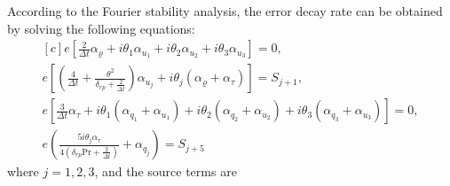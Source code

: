 \documentclass[onefignum,onetabnum]{siamart171218}
\begin{document}
According to the Fourier stability analysis, the error decay rate can be obtained by solving the following equations:
\begin{equation}\label{L_lin1_time_dependent}
\begin{aligned}[c]
e\left[\frac{2}{\Delta{t}}\alpha_\varrho+i\theta_1\alpha_{u_1}+i\theta_2\alpha_{u_2}+i\theta_3\alpha_{u_3}\right]=0, \\
e\left[\left(\frac{4}{\Delta{t}}+\frac{{\theta}^2}{\delta_{rp}+\frac{2}{\Delta{t}}}\right)\alpha_{u_j}+i\theta_j(\alpha_\varrho+\alpha_{\tau})\right]=S_{j+1},\\
e\left[\frac{3}{\Delta{t}}\alpha_{\tau}
+i\theta_1(\alpha_{q_1}+\alpha_{u_1})
+i\theta_2(\alpha_{q_2}+\alpha_{u_2})
+i\theta_3(\alpha_{q_3}+\alpha_{u_3})\right]=0,\\
e\left(\frac{5i\theta_j\alpha_{\tau}}{4(\delta_{rp}\text{Pr}+\frac{2}{\Delta{}t})}+\alpha_{q_j}\right)=S_{j+5}
\end{aligned}
\end{equation}
where $j=1,2,3$, and the source terms are
\end{document}
